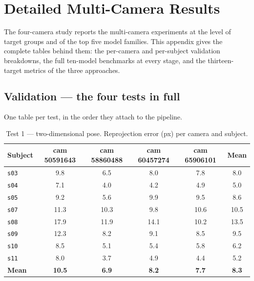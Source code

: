 \chapter{Detailed Multi-Camera Results}
\label{app:metrics}

The four-camera study reports the multi-camera experiments at the level of
target groups and of the top five model families. This appendix gives the
complete tables behind them: the per-camera and per-subject validation
breakdowns, the full ten-model benchmarks at every stage, and the
thirteen-target metrics of the three approaches.

\section{Validation --- the four tests in full}

One table per test, in the order they attach to the pipeline.

\begin{table}[H]
\centering
\caption{Test 1 --- two-dimensional pose. Reprojection error (px) per camera
and subject.}
\label{tab:app:t1}
\small
\begin{tabular}{@{}lccccc@{}}
\toprule
\textbf{Subject} & \textbf{cam 50591643} & \textbf{cam 58860488} &
\textbf{cam 60457274} & \textbf{cam 65906101} & \textbf{Mean} \\
\midrule
\texttt{s03} & 9.8 & 6.5 & 8.0 & 7.8 & 8.0 \\
\texttt{s04} & 7.1 & 4.0 & 4.2 & 4.9 & 5.0 \\
\texttt{s05} & 9.2 & 5.6 & 9.9 & 9.5 & 8.6 \\
\texttt{s07} & 11.3 & 10.3 & 9.8 & 10.6 & 10.5 \\
\texttt{s08} & 17.9 & 11.9 & 14.1 & 10.2 & 13.5 \\
\texttt{s09} & 12.3 & 8.2 & 9.1 & 8.5 & 9.5 \\
\texttt{s10} & 8.5 & 5.1 & 5.4 & 5.8 & 6.2 \\
\texttt{s11} & 8.0 & 3.7 & 4.9 & 4.4 & 5.2 \\
\midrule
\textbf{Mean} & \textbf{10.5} & \textbf{6.9} & \textbf{8.2} & \textbf{7.7} &
\textbf{8.3} \\
\bottomrule
\end{tabular}
\end{table}

